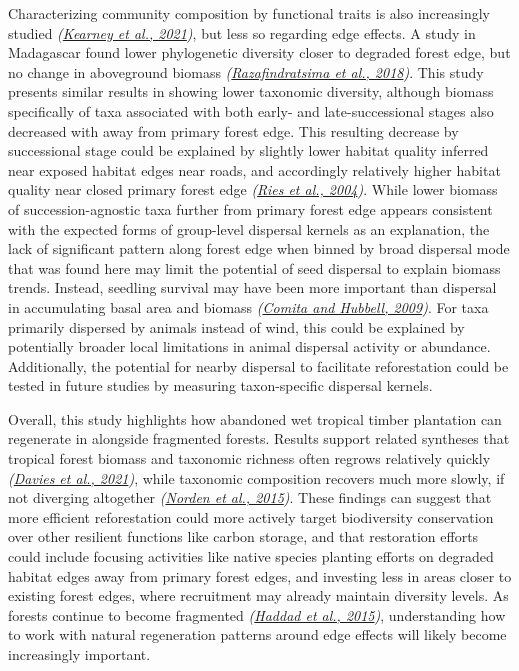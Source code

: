 \documentclass[
  12pt,
]{article}
\begin{document}
Characterizing community composition by functional traits is also increasingly studied \emph{(\protect\hyperlink{ref-kearney21}{Kearney et al., 2021})}, but less so regarding edge effects.
A study in Madagascar found lower phylogenetic diversity closer to degraded forest edge, but no change in aboveground biomass \emph{(\protect\hyperlink{ref-razafindratsima18}{Razafindratsima et al., 2018})}.
This study presents similar results in showing lower taxonomic diversity, although biomass specifically of taxa associated with both early- and late-successional stages also decreased with away from primary forest edge.
This resulting decrease by successional stage could be explained by slightly lower habitat quality inferred near exposed habitat edges near roads, and accordingly relatively higher habitat quality near closed primary forest edge \emph{(\protect\hyperlink{ref-ries04}{Ries et al., 2004})}.
While lower biomass of succession-agnostic taxa further from primary forest edge appears consistent with the expected forms of group-level dispersal kernels as an explanation, the lack of significant pattern along forest edge when binned by broad dispersal mode that was found here may limit the potential of seed dispersal to explain biomass trends.
Instead, seedling survival may have been more important than dispersal in accumulating basal area and biomass \emph{(\protect\hyperlink{ref-comita09}{Comita and Hubbell, 2009})}.
For taxa primarily dispersed by animals instead of wind, this could be explained by potentially broader local limitations in animal dispersal activity or abundance.
Additionally, the potential for nearby dispersal to facilitate reforestation could be tested in future studies by measuring taxon-specific dispersal kernels.

Overall, this study highlights how abandoned wet tropical timber plantation can regenerate in alongside fragmented forests.
Results support related syntheses that tropical forest biomass and taxonomic richness often regrows relatively quickly \emph{(\protect\hyperlink{ref-davies21a}{Davies et al., 2021})},
while taxonomic composition recovers much more slowly, if not diverging altogether \emph{(\protect\hyperlink{ref-norden15}{Norden et al., 2015})}.
These findings can suggest that more efficient reforestation could more actively target biodiversity conservation over other resilient functions like carbon storage, and that restoration efforts could include focusing activities like native species planting efforts on degraded habitat edges away from primary forest edges, and investing less in areas closer to existing forest edges, where recruitment may already maintain diversity levels.
As forests continue to become fragmented \emph{(\protect\hyperlink{ref-haddad15}{Haddad et al., 2015})}, understanding how to work with natural regeneration patterns around edge effects will likely become increasingly important.
\end{document}
